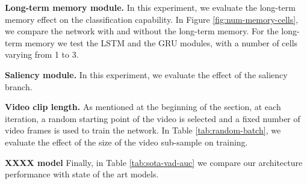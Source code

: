 
\noindent\textbf{Long-term memory module.}
In this experiment, we evaluate the long-term memory effect on the classification capability.
In Figure \ref{fig:num-memory-cells}, we compare the network with and without the long-term memory.
For the long-term memory we test the LSTM and the GRU modules, with a number of cells varying from 1 to 3.

\noindent\textbf{Saliency module.}
In this experiment, we evaluate the effect of the saliency branch.

\noindent\textbf{Video clip length.}
As mentioned at the beginning of the section, at each iteration, a random starting point of the video is selected and a fixed number of video frames is used to train the network.
In Table \ref{tab:random-batch}, we evaluate the effect of the size of the video sub-sample on training.

\noindent\textbf{XXXX model}
Finally, in Table \ref{tab:sota-vad-auc} we compare our architecture performance with state of the art models.
